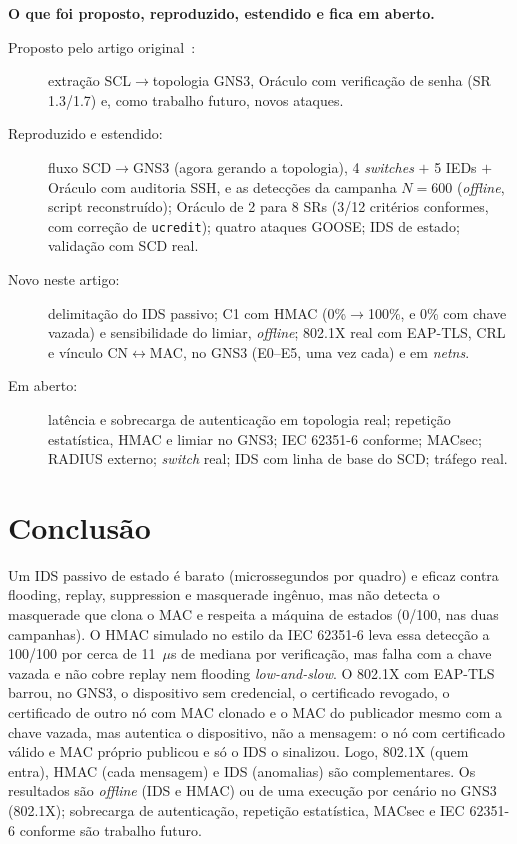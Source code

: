\documentclass[12pt]{article}
\renewcommand{\paragraph}[1]{\par\noindent\textbf{#1}\ }
\begin{document}
\paragraph{O que foi proposto, reproduzido, estendido e fica em aberto.}
\begin{description}
  \item[Proposto pelo artigo original~\cite{oliveira2025analisador}:] extra\c{c}\~ao SCL$\rightarrow$topologia GNS3, Or\'aculo com verifica\c{c}\~ao de senha (SR 1.3/1.7) e, como trabalho futuro, novos ataques.
  \item[Reproduzido e estendido:] fluxo SCD$\rightarrow$GNS3 (agora gerando a topologia), 4 \emph{switches} $+$ 5 IEDs $+$ Or\'aculo com auditoria SSH, e as detec\c{c}\~oes da campanha $N=600$ (\emph{offline}, script reconstru\'ido); Or\'aculo de 2 para 8 SRs (3/12 crit\'erios conformes, com corre\c{c}\~ao de \texttt{ucredit}); quatro ataques GOOSE; IDS de estado; valida\c{c}\~ao com SCD real.
  \item[Novo neste artigo:] delimita\c{c}\~ao do IDS passivo; C1 com HMAC (0\%$\rightarrow$100\%, e 0\% com chave vazada) e sensibilidade do limiar, \emph{offline}; 802.1X real com EAP-TLS, CRL e v\'inculo CN$\leftrightarrow$MAC, no GNS3 (E0--E5, uma vez cada) e em \emph{netns}.
  \item[Em aberto:] lat\^encia e sobrecarga de autentica\c{c}\~ao em topologia real; repeti\c{c}\~ao estat\'istica, HMAC e limiar no GNS3; IEC 62351-6 conforme; MACsec; RADIUS externo; \emph{switch} real; IDS com linha de base do SCD; tr\'afego real.
\end{description}

\section{Conclus\~ao}

Um IDS passivo de estado \'e barato (microssegundos por quadro) e eficaz contra flooding, replay, suppression e masquerade ing\^enuo, mas n\~ao detecta o masquerade que clona o MAC e respeita a m\'aquina de estados (0/100, nas duas campanhas). O HMAC simulado no estilo da IEC 62351-6 leva essa detec\c{c}\~ao a 100/100 por cerca de 11~$\mu$s de mediana por verifica\c{c}\~ao, mas falha com a chave vazada e n\~ao cobre replay nem flooding \emph{low-and-slow}. O 802.1X com EAP-TLS barrou, no GNS3, o dispositivo sem credencial, o certificado revogado, o certificado de outro n\'o com MAC clonado e o MAC do publicador mesmo com a chave vazada, mas autentica o dispositivo, n\~ao a mensagem: o n\'o com certificado v\'alido e MAC pr\'oprio publicou e s\'o o IDS o sinalizou. Logo, 802.1X (quem entra), HMAC (cada mensagem) e IDS (anomalias) s\~ao complementares. Os resultados s\~ao \emph{offline} (IDS e HMAC) ou de uma execu\c{c}\~ao por cen\'ario no GNS3 (802.1X); sobrecarga de autentica\c{c}\~ao, repeti\c{c}\~ao estat\'istica, MACsec e IEC 62351-6 conforme s\~ao trabalho futuro.

{\footnotesize
}
\end{document}
